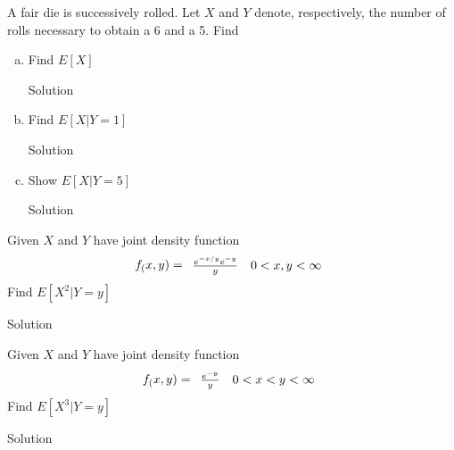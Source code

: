 \documentclass{article}
\begin{document}
\begin{spacing}{1.1}
\newpage
\begin{homeworkProblem}
  A fair die is successively rolled. Let $X$ and $Y$ denote, 
  respectively, the number of rolls necessary to obtain a 
  6 and a 5. Find
  \begin{enumerate}[(a)]
    \item Find $E[X]$
      \begin{homeworkSection}{Solution}
      \end{homeworkSection}
    \item Find $E[X|Y = 1]$
      \begin{homeworkSection}{Solution}
      \end{homeworkSection}
    \item Show $E[X|Y = 5]$
      \begin{homeworkSection}{Solution}
      \end{homeworkSection}
  \end{enumerate}
\end{homeworkProblem}

\newpage
\begin{homeworkProblem}
  Given $X$ and $Y$ have joint density function
  \[
    f_( x, y) = \begin{array}{l l}
      \frac{ e^{-x/y} e^{-y}}{ y} & 0 < x,y < \infty\\
    \end{array}
  \]
  Find $E[ X^2|Y = y]$
  \begin{homeworkSection}{Solution}
    
  \end{homeworkSection}
\end{homeworkProblem}

\newpage
\begin{homeworkProblem}
  Given $X$ and $Y$ have joint density function
  \[
    f_( x, y) = \begin{array}{l l}
      \frac{ e^{-y}}{ y} & 0 < x < y < \infty\\
    \end{array}
  \]
  Find $E[ X^3|Y = y]$
  \begin{homeworkSection}{Solution}

  \end{homeworkSection}
\end{homeworkProblem}
  
\end{spacing}
\end{document}
